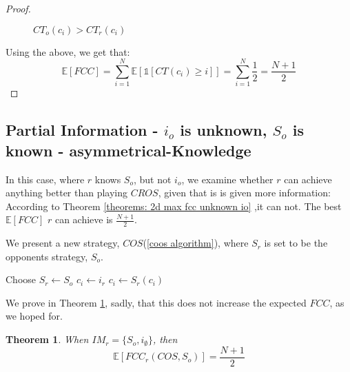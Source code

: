 \documentclass[letterpaper, 10 pt, conference]{ieeeconf}  %
\newtheorem{theorem}{Theorem}[section]
\newcommand\rob{\ensuremath{r}\xspace}
\newcommand\opp{\ensuremath{o}\xspace}
\newcommand{\fcc}{\ensuremath{FCC}\xspace}
\newcommand{\cros}{\ensuremath{CROS}\xspace}
\newcommand{\coos}{\ensuremath{COS}\xspace}
\begin{document}
\begin{proof}
\begin{figure}[tb]
    \caption{${CT}_{\opp}(c_i) > {CT}_{\rob}(c_i)$}
    \label{figures: covering-times}
   \end{figure}

Using the above, we get that:
\begin{dmath*}[compact]
\mathbb{E}[\fcc]=\sum_{i=1}^{N}{\mathbb{E}\left[\mathds{1}\left[CT\left(c_i\right)\geq i\right]\right]}={\sum_{i=1}^{N}{\frac{1}{2}}=\frac{N+1}{2}}
\end{dmath*}
\end{proof}

\subsection{Partial Information - $i_\opp$ is unknown, $S_\opp$ is known - asymmetrical-Knowledge} 


In this case, where \rob knows $S_\opp$, but not $i_\opp$, we examine whether \rob can achieve anything better than playing \cros, given that is is given more information: According to Theorem \ref{theorems: 2d max fcc unknown io} ,it can not. The best $\mathbb{E}[\fcc]$ \rob can achieve is $\frac{N+1}{2}$.

We present a new strategy, \coos(\ref{coos algorithm}), where $S_\rob$ is set to be the opponents strategy, $S_\opp$. 
\begin{algorithm}
\begin{algorithmic}
	\STATE Choose $S_\rob \leftarrow S_\opp$
    \STATE $c_i \leftarrow i_\rob$
    \LOOP
    	\STATE $c_i \leftarrow S_\rob(c_i)$
    \ENDLOOP
  
\end{algorithmic}
\caption{\coos\label{coos algorithm}}
\end{algorithm}

We prove in Theorem \ref{theorems: coos stupid}, sadly, that this does not increase the expected \fcc, as we hoped for.
\begin{theorem} \label{theorems: coos stupid}
When $IM_\rob=\lbrace S_\opp , i_\emptyset \rbrace$, then \[\mathbb{E}[\fcc_\rob(\coos, S_\opp)]=\frac{N+1}{2}\]
\end{theorem}
\end{document}
